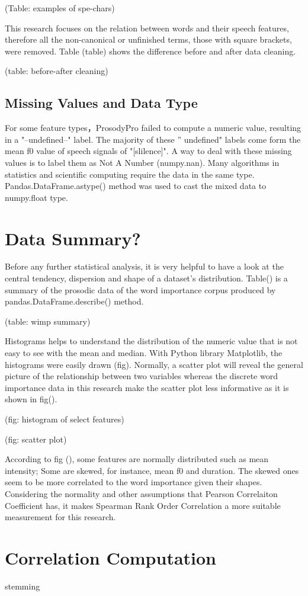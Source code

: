 (Table: examples of spe-chars)

This research focuses on the relation between words and their speech features, therefore all the non-canonical  or unfinished terms, those with square brackets, were removed. Table (table) shows the difference before and after data cleaning.

(table: before-after cleaning)


\subsection{Missing Values and Data Type}
For some feature types，ProsodyPro failed to compute a numeric value, resulting in a "--undefined--" label. The majority of these '' undefined" labels come form the mean f0 value of speech signals of "[slilence]". A way to deal with these missing values is to label them as Not A Number (numpy.nan). Many algorithms in statistics and scientific computing require the data in the same type. Pandas.DataFrame.astype() method was used to cast the mixed data to numpy.float type.


\section{Data Summary?}
Before any further statistical analysis, it is very helpful to have a look at the central tendency, dispersion and shape of a dataset's distribution. Table() is a summary of the prosodic data of the word importance corpus produced by pandas.DataFrame.describe() method.

(table: wimp summary)

Histograms helps to understand the distribution of the numeric value that is not easy to see with the mean and median. With Python library Matplotlib, the histograms were easily drawn (fig). Normally, a scatter plot will reveal the general picture of the relationship between two variables whereas the discrete word importance data in this research make the scatter plot less informative as it is shown in fig().

(fig: histogram of select features)

(fig: scatter plot)

According to fig (), some features are normally distributed such as  mean intensity; Some are skewed, for instance, mean f0 and duration. The skewed ones seem to be more correlated to the word importance given their shapes. Considering the normality and other assumptions that Pearson Correlaiton Coefficient has, it makes Spearman Rank Order Correlation a more suitable measurement for this research.

\section{Correlation Computation}
stemming










